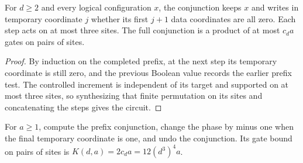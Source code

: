 \begin{lemma}
    \label{thm:mpu_reversible_zero_conjunction}
    \leanok
    For $d\geq2$ and every logical configuration $x$, the conjunction
    keeps $x$ and writes in temporary coordinate $j$ whether its
    first $j+1$ data coordinates are all zero. Each step acts on
    at most three sites. The full conjunction is a product of at
    most $c_da$ gates on pairs of sites.
\end{lemma}
\begin{proof}\leanok
    By induction on the completed prefix, at the next step its temporary
    coordinate is still zero, and the previous Boolean value records
    the earlier prefix test. The controlled increment is independent
    of its target and supported on at most three sites, so synthesizing
    that finite permutation on its sites and concatenating the steps gives the circuit.
\end{proof}

\begin{definition}
    \label{def:mpu_clean_zero_register_reflection}
    \leanok
    For $a\geq1$, compute the prefix conjunction, change the phase
    by minus one when the final temporary coordinate is one, and
    undo the conjunction. Its gate bound on pairs of sites is
    $K(d,a)=2c_da=12(d^3)^4a$.
\end{definition}

